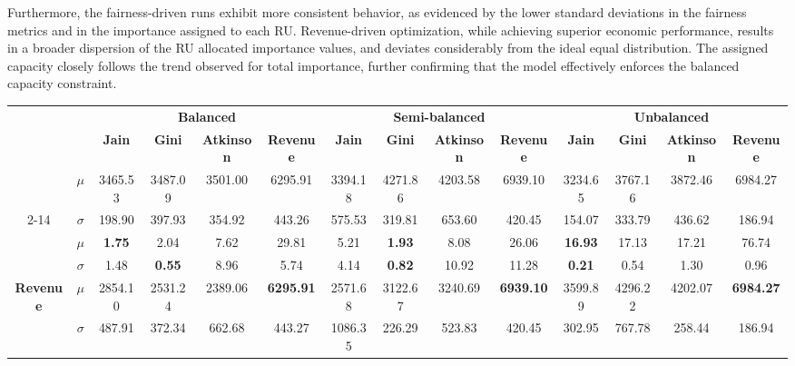 \documentclass[preprint,12pt]{elsarticle}
\begin{document}
Furthermore, the fairness-driven runs exhibit more consistent behavior, as evidenced by the lower standard deviations in the fairness metrics and in the importance assigned to each RU. Revenue-driven optimization, while achieving superior economic performance, results in a broader dispersion of the RU allocated importance values, and deviates considerably from the ideal equal distribution. The assigned capacity closely follows the trend observed for total importance, further confirming that the model effectively enforces the balanced capacity constraint. 

\begin{table}[htbp]
\centering
\begin{adjustbox}{max width=\textwidth}
\begin{tabular}{|c|c|cccc|cccc|cccc|}
\cline{3-14}
\multicolumn{2}{c|}{} & \multicolumn{4}{c|}{\textbf{Balanced}} & \multicolumn{4}{c|}{\textbf{Semi-balanced}} & \multicolumn{4}{c|}{\textbf{Unbalanced}} \\
\cline{3-14}
\multicolumn{2}{c|}{} & \textbf{Jain} & \textbf{Gini} & \textbf{Atkinson} & \textbf{Revenue} & \textbf{Jain} & \textbf{Gini} & \textbf{Atkinson} & \textbf{Revenue} & \textbf{Jain} & \textbf{Gini} & \textbf{Atkinson} & \textbf{Revenue} \\
\hline

\multirow{2}{*}{\textbf{Inequity}} 
   & $\mu$    & \textbf{1.75}    & 2.04    & 7.62    & 29.81   & 5.21    & \textbf{1.93}    & 8.08    & 26.06   & \textbf{16.93}   & 17.13   & 17.21   & 76.74 \\
\cline{2-14}
   & $\sigma$ & 1.48    & \textbf{0.55}    & 8.96    & 5.74    & 4.14    & \textbf{0.82}    & 10.92   & 11.28   & \textbf{0.21}    & 0.54    & 1.30    & 0.96 \\
\hline
\multirow{2}{*}{\textbf{Revenue}}
   & $\mu$    & 2854.10 & 2531.24 & 2389.06 & \textbf{6295.91} & 2571.68 & 3122.67 & 3240.69 & \textbf{6939.10} & 3599.89 & 4296.22 & 4202.07 & \textbf{6984.27} \\
\cline{2-14}
   & $\sigma$ & 487.91  & 372.34  & 662.68  & 443.27  & 1086.35 & 226.29  & 523.83  & 420.45  & 302.95  & 767.78  & 258.44  & 186.94 \\

\end{tabular}
\end{adjustbox}
\end{table}
\end{document}
